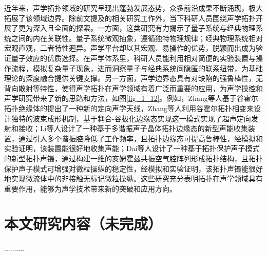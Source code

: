 近年来，声学拓扑领域的研究呈现出蓬勃发展态势，众多前沿成果不断涌现，极大拓展了该领域边界。除前文提及的相关研究工作外，当下科研人员围绕声学拓扑开展了更为深入且全面的探索\cite{j1,j2,j3,j4,j5,j6,j7,j8,j9,j10,j11,j12,j13,j14,j15,j16,j17}。一方面，这类研究有力揭示了量子系统与经典物理系统之间的内在关联性。量子系统微观抽象，遵循独特物理规律；经典物理系统相对宏观直观，二者特性迥异。声学平台却以其宏观、易操作的优势，脱颖而出成为验证量子效应的优质选择。在声学体系里，科研人员能利用相对简便的实验装置与操作流程，模拟复杂量子现象，进而洞察量子与经典系统间隐匿的联系纽带，为基础理论的深度融合提供关键支撑。另一方面，声学边界态具有对缺陷的强鲁棒性，无背向散射等特性，使得声学拓扑在声学领域有着广泛而重要的应用，为声学操控和声学研究带来了新的思路和方法，如图\ref{fig_1_12}。例如，Zhang等人基于谷霍尔拓扑绝缘体的提出了一种新的定向声学天线，Zhang等人利用谷霍尔拓扑相变来设计独特的波束成形机制，基于耦合-谷极化边缘态实现这一模式实现了超声定向发射和接收\cite{j2}；Li等人设计了一种基于多谐振声子晶体拓扑边缘态的新型声能收集装置，通过引入多个谐振腔降低了工作频率，且拓扑边缘态可提高鲁棒性，经模拟和实验证明，该装置能很好地收集声能\cite{j17}；Dai等人设计了一种基于拓扑保护声子模式的新型拓扑声镊，通过构建一维的亥姆霍兹共振空气腔阵列形成拓扑结构，且拓扑保护声子模式可增强对微粒操纵的稳定性，经模拟和实验证明，该拓扑声镊能很好地实现微流体中的非接触无标记微粒操纵\cite{j13}。这些研究充分表明拓扑在声学领域具有重要作用，能够为声学技术带来新的突破和应用方向。

\section{本文研究内容（未完成）}

..........